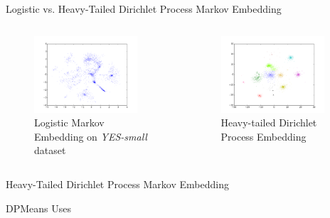\documentclass{beamer}
\begin{document}
\begin{frame}{Logistic vs. Heavy-Tailed Dirichlet Process Markov Embedding}
\begin{columns}[c]
\column{5.5cm}
\begin{figure}
  \caption{Logistic Markov Embedding on \emph{YES-small} dataset \cite{LME}}
    \includegraphics[width=0.9\textwidth]{LME.png}
\end{figure}
\column{5.5cm}
\pause
\begin{figure}
  \caption{Heavy-tailed Dirichlet Process Embedding}
    \includegraphics[width=0.9\textwidth]{ProbEmbed.png}
\end{figure}
\end{columns}
\end{frame}

\begin{frame}{Heavy-Tailed Dirichlet Process Markov Embedding}
  \begin{block}{DPMeans}
  Uses \cite{DPMeans}
   \end{block}

\end{frame}
\end{document}
